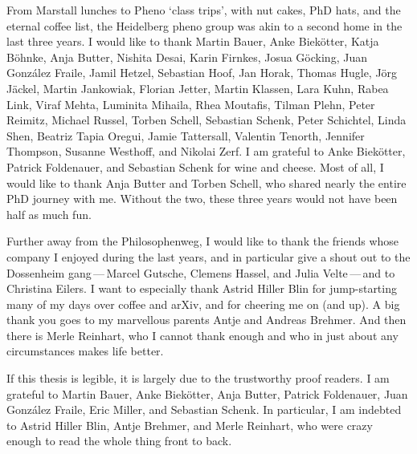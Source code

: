 From Marstall lunches to Pheno `class trips', with nut cakes, PhD
hats, and the eternal coffee list, the Heidelberg pheno group was akin
to a second home in the last three years. I would like to thank Martin
Bauer, Anke Biek\"otter, Katja B\"ohnke, Anja Butter, Nishita Desai,
Karin Firnkes, Josua G\"ocking, Juan Gonz\'alez Fraile, Jamil Hetzel,
Sebastian Hoof, Jan Horak, Thomas Hugle, J\"org J\"ackel, Martin
Jankowiak, Florian Jetter, Martin Klassen, Lara Kuhn, Rabea Link,
Viraf Mehta, Luminita Mihaila, Rhea Moutafis, Tilman Plehn, Peter
Reimitz, Michael Russel, Torben Schell, Sebastian Schenk, Peter
Schichtel, Linda Shen, Beatriz Tapia Oregui, Jamie Tattersall,
Valentin Tenorth, Jennifer Thompson, Susanne Westhoff, and Nikolai
Zerf. I am grateful to Anke Biek\"otter, Patrick Foldenauer, and
Sebastian Schenk for wine and cheese. Most of
all, I would like to thank Anja Butter and Torben Schell, who shared
nearly the entire PhD journey with me. Without the two, these three
years would not have been half as much fun.

Further away from the Philosophenweg, I would like to thank the
friends whose company I enjoyed during the last years, and in
particular give a shout out to the Dossenheim gang\,---\,Marcel
Gutsche, Clemens Hassel, and Julia Velte\,---\,and to Christina
Eilers. I want to especially thank Astrid Hiller Blin for
jump-starting many of my days over coffee and arXiv, and for cheering
me on (and up). A big thank you goes to my marvellous parents Antje
and Andreas Brehmer. And then there is Merle Reinhart, who I cannot
thank enough and who in just about any circumstances makes life
better.

If this thesis is legible, it is largely due to the trustworthy proof
readers. I am grateful to Martin Bauer, Anke Biek\"otter, Anja Butter,
Patrick Foldenauer, Juan Gonz\'alez Fraile, Eric Miller, and Sebastian
Schenk. In particular, I am indebted to Astrid Hiller Blin, Antje
Brehmer, and Merle Reinhart, who were crazy enough to read the whole
thing front to back.

